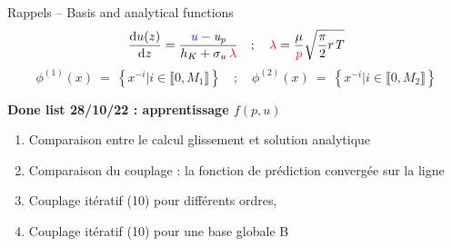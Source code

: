 \documentclass[aspect ratio=169,t]{beamer}
\newcommand\blue[1]{\textcolor{blue}{#1}} %
\newcommand\red[1]{\textcolor{red}{#1}} %
\newcommand{\rd}{\right} %
\newcommand{\ld}{\left} %
\numberwithin{equation}{section} %
\begin{document}
\begin{frame}{Rappels -- Basis and analytical functions}
\begin{equation*}
    \frac{{\rm d}  u(z)}{{\rm d} z}= {\frac { {\it {\blue{u}}-u_p} }{ h_{K}+{\sigma_u\,\red{\lambda}}} } \quad ; \quad {\red{\lambda}} = {\frac {\mu}{\red p}} \sqrt {\frac {\pi}{2} r {\it T}}
    \label{eq:pente_analytique}
\end{equation*} 
\begin{equation*}
\phi^{(1)}{({x})}~=~\ld\{ x^{-i}\vert i\in \llbracket0,M_1\rrbracket\rd\}
\quad ; \quad \phi^{(2)}{({x})}~=~\ld\{ x^{-i}\vert i\in \llbracket0,M_2\rrbracket\rd\}  
\end{equation*}

\vspace{0.5cm}

\textbf{{Done list 28/10/22} : apprentissage $f(p,u)$}
\begin{enumerate}
    \item Comparaison entre le calcul glissement et solution analytique
    \item Comparaison du couplage : la fonction de prédiction convergée sur la ligne
    \item Couplage itératif (10) pour différents ordres,
    \item Couplage itératif (10) pour une base globale B 
\end{enumerate}
\end{frame}
\end{document}
